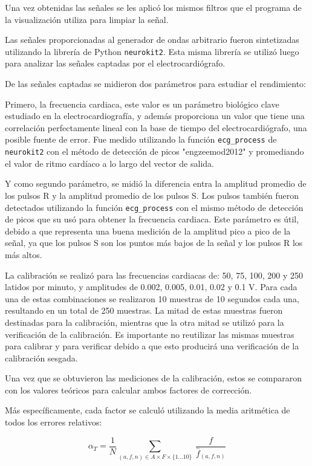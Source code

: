 \documentclass[conference]{IEEEtran}
\begin{document}
Una vez obtenidas las señales se les aplicó los mismos filtros que el programa de
la visualización utiliza para limpiar la señal.

Las señales proporcionadas al generador de ondas arbitrario fueron sintetizadas 
utilizando la librería de Python \texttt{neurokit2}. \cite{neurokit2}
Esta misma librería se utilizó
luego para analizar las señales captadas por el electrocardiógrafo.

De las señales captadas se midieron dos parámetros para estudiar el rendimiento:

Primero, la frecuencia cardiaca, este valor es un parámetro biológico clave estudiado
en la electrocardiografía, y además proporciona un valor que tiene una correlación
perfectamente lineal con la base de tiempo del electrocardiógrafo, una posible fuente
de error. Fue medido utilizando la función \texttt{ecg\_process} de \texttt{neurokit2}
con  el método de detección de picos "engzeemod2012" y promediando el valor de ritmo
cardíaco a lo largo del vector de salida.

Y como segundo parámetro, se midió la diferencia entra la amplitud promedio de los
pulsos R y la amplitud promedio de los pulsos S. Los pulsos también fueron detectados
utilizando la función \texttt{ecg\_process} con el mismo método de detección de picos
que su usó para obtener la frecuencia cardiaca. Este parámetro es útil, debido a que
representa una buena medición de la amplitud pico a pico de la señal, ya que los
pulsos S son los puntos más bajos de la señal y los pulsos R los más altos.

La calibración se realizó para las frecuencias cardiacas de: 50, 75, 100, 200 y 250
latidos por minuto, y amplitudes de 0.002, 0.005, 0.01, 0.02 y 0.1 V.
Para cada una de estas combinaciones se realizaron 10 muestras de 10 segundos cada
una, resultando en un total de 250 muestras. La mitad de estas muestras fueron
destinadas para la calibración, mientras que la otra  mitad se utilizó para la
verificación de la calibración. Es importante no reutilizar las mismas muestras para
calibrar y para verificar debido a que esto producirá una verificación de la
calibración sesgada.

Una vez que se obtuvieron las mediciones de la calibración, estos se compararon con 
los valores teóricos para calcular ambos factores de corrección.

Más específicamente, cada factor se calculó utilizando la media aritmética
de todos los errores relativos:

$$\alpha_{T} = \dfrac{1}{N} \sum_{(a,f,n) \in A \times F \times \{1...10 \}}\nolimits
~ \frac{f}{\hat{f}_{(a,f,n)}} $$ 
 
\end{document}
